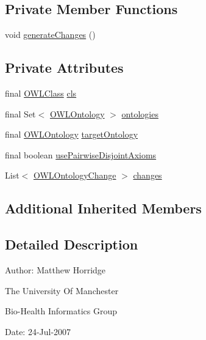 \subsection*{Private Member Functions}
\begin{DoxyCompactItemize}
\item 
void \hyperlink{classorg_1_1semanticweb_1_1owlapi_1_1_make_primitive_sub_classes_mutually_disjoint_ab47357409bb07da042f7c6ab329a7535}{generate\-Changes} ()
\end{DoxyCompactItemize}
\subsection*{Private Attributes}
\begin{DoxyCompactItemize}
\item 
final \hyperlink{interfaceorg_1_1semanticweb_1_1owlapi_1_1model_1_1_o_w_l_class}{O\-W\-L\-Class} \hyperlink{classorg_1_1semanticweb_1_1owlapi_1_1_make_primitive_sub_classes_mutually_disjoint_ac3410194653892673d57bdf45b537496}{cls}
\item 
final Set$<$ \hyperlink{interfaceorg_1_1semanticweb_1_1owlapi_1_1model_1_1_o_w_l_ontology}{O\-W\-L\-Ontology} $>$ \hyperlink{classorg_1_1semanticweb_1_1owlapi_1_1_make_primitive_sub_classes_mutually_disjoint_a1ebd8cb904611b999707be5e8ebebc5d}{ontologies}
\item 
final \hyperlink{interfaceorg_1_1semanticweb_1_1owlapi_1_1model_1_1_o_w_l_ontology}{O\-W\-L\-Ontology} \hyperlink{classorg_1_1semanticweb_1_1owlapi_1_1_make_primitive_sub_classes_mutually_disjoint_adab8f45e0330964afc5f5e1b8d903330}{target\-Ontology}
\item 
final boolean \hyperlink{classorg_1_1semanticweb_1_1owlapi_1_1_make_primitive_sub_classes_mutually_disjoint_af5e425400eccc4cdc710326068a71846}{use\-Pairwise\-Disjoint\-Axioms}
\item 
List$<$ \hyperlink{classorg_1_1semanticweb_1_1owlapi_1_1model_1_1_o_w_l_ontology_change}{O\-W\-L\-Ontology\-Change} $>$ \hyperlink{classorg_1_1semanticweb_1_1owlapi_1_1_make_primitive_sub_classes_mutually_disjoint_aa32b9797f2b492facc23a6819dc30213}{changes}
\end{DoxyCompactItemize}
\subsection*{Additional Inherited Members}


\subsection{Detailed Description}
Author\-: Matthew Horridge\par
 The University Of Manchester\par
 Bio-\/\-Health Informatics Group\par
 Date\-: 24-\/\-Jul-\/2007\par
 \par
 

